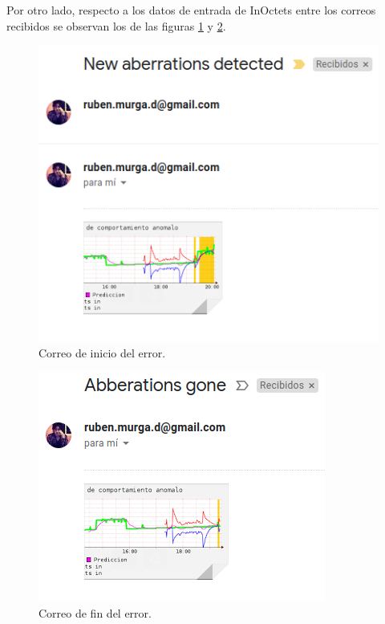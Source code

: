 \FloatBarrier
Por otro lado, respecto a los datos de entrada de InOctets entre los correos recibidos se observan los de las figuras \ref{image:inicio1} y \ref{image:fin1}.
\FloatBarrier
\begin{figure}[htbp!]
		\centering
			\includegraphics[width=.65 \textwidth]{images/inicio1}
		\caption{Correo de inicio del error.}
		\label{image:inicio1}
\end{figure}
\FloatBarrier
\FloatBarrier
\begin{figure}[htbp!]
		\centering
			\includegraphics[width=.6 \textwidth]{images/fin1}
		\caption{Correo de fin del error.}
		\label{image:fin1}
\end{figure}
\FloatBarrier

